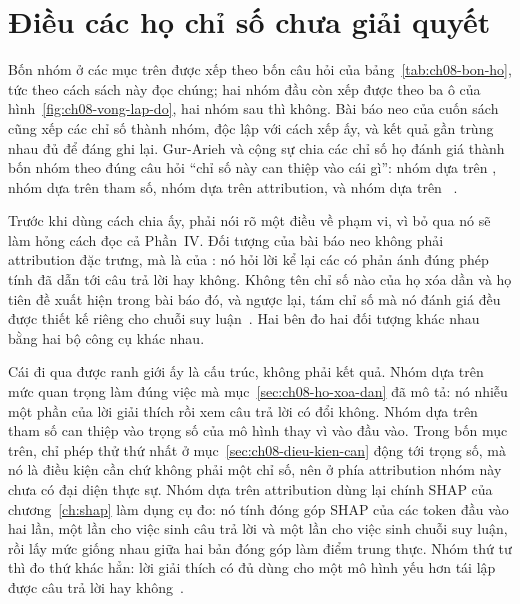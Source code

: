 \section{Điều các họ chỉ số chưa giải quyết}
\label{sec:ch08-dieu-chua-giai-quyet}

%
%
Bốn nhóm ở các mục trên được xếp theo bốn câu hỏi của
bảng~\ref{tab:ch08-bon-ho}, tức theo cách sách này đọc chúng; hai nhóm đầu còn
xếp được theo ba ô của hình~\ref{fig:ch08-vong-lap-do}, hai nhóm sau thì không. Bài báo neo
của cuốn sách cũng xếp các chỉ số thành nhóm, độc lập với cách xếp ấy, và kết
quả gần trùng nhau đủ để đáng ghi lại. Gur-Arieh và cộng sự chia các chỉ số họ
đánh giá thành bốn nhóm theo đúng câu hỏi \enquote{chỉ số này can thiệp vào
cái gì}: nhóm dựa trên , nhóm dựa trên tham số, nhóm dựa trên
attribution, và nhóm dựa trên
~\autocite{p21metrics}.

Trước khi dùng cách chia ấy, phải nói rõ một điều về phạm vi, vì bỏ qua nó sẽ
làm hỏng cách đọc cả Phần~IV. Đối tượng của bài báo neo không phải attribution
đặc trưng, mà là  của
:
nó hỏi lời kể lại các  có phản ánh đúng phép tính
đã dẫn tới câu trả lời hay không. Không tên chỉ số nào của họ xóa dần và họ tiên đề xuất hiện trong bài báo đó, và
ngược lại, tám chỉ số mà nó đánh giá đều được thiết kế riêng cho chuỗi suy
luận~\autocite{p21metrics}. Hai bên đo hai đối tượng khác nhau bằng hai bộ
công cụ khác nhau.

Cái đi qua được ranh giới ấy là cấu trúc, không phải kết quả. Nhóm dựa trên mức
quan trọng làm đúng việc mà mục~\ref{sec:ch08-ho-xoa-dan} đã mô tả: nó nhiễu một
phần của lời giải thích rồi xem câu trả lời có đổi không. Nhóm dựa trên tham số
can thiệp vào trọng số của mô hình thay vì vào đầu vào. Trong bốn mục trên, chỉ
phép thử thứ nhất ở mục~\ref{sec:ch08-dieu-kien-can} động tới trọng số, mà nó
là điều kiện cần chứ không phải một chỉ số, nên ở phía attribution nhóm này
chưa có đại diện thực sự. Nhóm dựa trên attribution dùng lại chính SHAP của
chương~\ref{ch:shap} làm dụng cụ đo: nó tính đóng góp SHAP của các token đầu
vào hai lần, một lần cho việc sinh câu trả lời và một lần cho việc sinh chuỗi
suy luận, rồi lấy mức giống nhau giữa hai bản đóng góp làm điểm trung thực.
Nhóm thứ tư thì đo thứ khác hẳn: lời giải
thích có đủ dùng cho một mô hình yếu hơn tái lập được câu trả lời hay
không~\autocite{p21metrics}.

